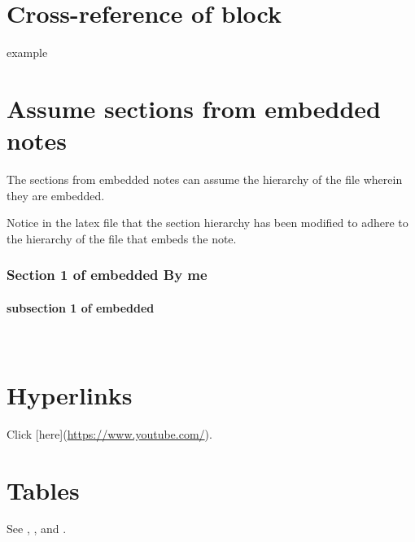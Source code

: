 \documentclass{doc_class_fontsize}{extarticle}
\begin{document}
\section{\maltese Cross-reference of block}

example



\section{Assume sections from embedded notes}

The sections from embedded notes can assume the hierarchy of the file wherein they are embedded.

\begin{tcolorbox}[width=1.0\textwidth,colback={white},title={note},outer arc=0mm,colupper=black]

Notice in the latex file that the section hierarchy has been modified to adhere to the hierarchy of the file that embeds the note.

\end{tcolorbox}




\subsubsection{Section 1 of embedded By me}
\paragraph{subsection 1 of embedded} \hspace{0pt} \\




\section{Hyperlinks}

Click [here](\url{https://www.youtube.com/}).





\section{Tables}



See , , and .
\end{document}
